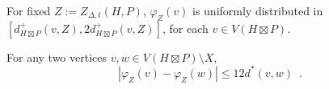 \documentclass{patmorin}
\renewcommand{\ge}{\geqslant}
\renewcommand{\le}{\leqslant}
\begin{document}


\begin{obs}\label{uniform}
  For fixed $Z:=Z_{\Delta,t}(H,P)$, $\varphi_Z(v)$ is uniformly distributed in $[d^+_{H\boxtimes P}(v,Z), 2d^+_{H\boxtimes P}(v,Z)]$, for each $v\in V(H\boxtimes P)$.
\end{obs}


\begin{lem}\label{double_distance}
  For any two vertices $v,w\in V(H\boxtimes P)\setminus X$,
  \[
    |\varphi_Z(v)-\varphi_Z(w)| \le 12 d^*(v,w) \enspace .
  \]
\end{lem}
\end{document}
